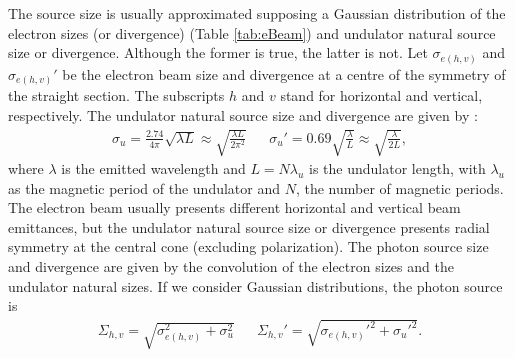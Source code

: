 \documentclass{iucr}              %
\begin{document}
The source size is usually approximated supposing a Gaussian distribution of the electron sizes (or divergence) (Table \ref{tab:eBeam}) and undulator natural source size or divergence. Although the former is true, the latter is not. Let $\sigma_{e(h,v)}$ and $\sigma_{e(h,v)}'$ be the electron beam size and divergence at a centre of the symmetry of the straight section. The subscripts $h$ and $v$ stand for horizontal and vertical, respectively. The undulator natural source size and divergence are given by \cite{elleaume}:
\begin{align}
    \label{eq:photon small sigmas}
    \sigma_u=\frac{2.74}{4\pi}\sqrt{\lambda L}\approx \sqrt{\frac{\lambda L}{2 \pi^2}}  && \sigma_u' = 0.69\sqrt{\frac{\lambda}{L}}\approx \sqrt{\frac{\lambda}{2 L}},
\end{align}
where $\lambda$ is the emitted wavelength and $L=N\lambda_u$ is the undulator length, with $\lambda_u$ as the magnetic period of the undulator and $N$, the number of magnetic periods. The electron beam usually presents different horizontal and vertical beam emittances, but the undulator natural source size or divergence presents radial symmetry at the central cone (excluding polarization). The photon source size and divergence are given by the convolution of the electron sizes and the undulator natural sizes. If we consider Gaussian distributions, the photon source is
\begin{align}
\label{eq:photon big sigmas}
\Sigma_{h,v}=\sqrt{\sigma_{e(h,v)}^2 + \sigma_u^2} && \Sigma_{h,v}'=\sqrt{\sigma_{e(h,v)}'^2 + \sigma_u'^2}.
\end{align}

\end{document}

